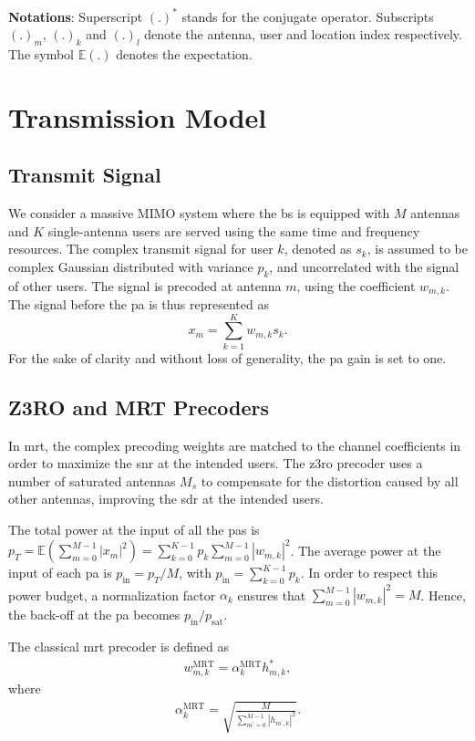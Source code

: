 \documentclass[conference]{IEEEtran}
\newcommand{\gilles}[1]{{\color{orange}[Gilles: #1]}}
\newcommand{\update}[1]{{#1}}
\newcommand{\zero}[0]{\gls{z3ro}\xspace}
\newcommand{\zerop}[0]{\zero precoder\xspace}
\newcommand{\mrt}[0]{\gls{mrt}\xspace}
\newcommand{\mrtp}[0]{\mrt precoder\xspace}
\newcommand{\pa}[0]{\gls{pa}\xspace}
\newcommand{\pas}[0]{\glspl{pa}\xspace}
\begin{document}
\update{\textbf{Notations}: Superscript $(.)^*$ stands for the conjugate operator. Subscripts $(.)_m$, $(.)_k$ and $(.)_l$ denote the antenna, user and location index respectively. The symbol $\mathbb{E}(.)$ denotes the expectation.}

\section{Transmission Model}
\subsection{Transmit Signal}
We consider a massive MIMO system where the \gls{bs} is equipped with $M$ antennas and $K$ single-antenna users are served using the same time and frequency resources. The complex transmit signal for user $k$, denoted as $s_k$, is assumed to be complex Gaussian distributed with variance $p_k$, and uncorrelated with the signal of other users. The signal is precoded at antenna $m$, using the coefficient $w_{m,k}$. The signal before the \pa is thus represented as 
$$x_{m} = \sum_{k=1}^K w_{m,k} s_k.$$ 
For the sake of clarity and without loss of generality, the \gls{pa} gain is set to one.
\subsection{Z3RO and MRT Precoders}
In \gls{mrt}, the complex precoding weights are matched to the channel coefficients in order to maximize the \gls{snr} at the intended users. The \zerop uses a number of saturated antennas $M_s$ to compensate for the distortion caused by all other antennas, improving the \gls{sdr} at the intended users.

The total power at the input of all the \pas is $p_T=\mathbb{E}\left(\sum_{m=0}^{M-1} |x_m|^2\right)=\sum_{k=0}^{K-1} p_k \sum_{m=0}^{M-1}|w_{m,k}|^2$. The average power at the input of each \pa is $p_{\mathrm{in}}=p_T/M$, with $p_{\mathrm{in}}=\sum_{k=0}^{K-1}p_k$. In order to respect this power budget, a normalization factor $\alpha_k$ ensures that $\sum_{m=0}^{M-1}|w_{m,k}|^2=M$. Hence, the back-off at the \pa becomes $p_{\mathrm{in}}/p_{\mathrm{sat}}$.

The classical \mrtp is defined as
\begin{align*}
    w_{m,k}^{\mathrm{MRT}}=\alpha_{k}^{\mathrm{MRT}} h_{m,k}^{*},
\end{align*}
where
\begin{align*}
\alpha_{k}^{\mathrm{MRT}}=\sqrt{\frac{M} {\sum_{m^{\prime}=0}^{M-1}\left|h_{m^{\prime},k}\right|^{2}}}.
\end{align*}
\end{document}
